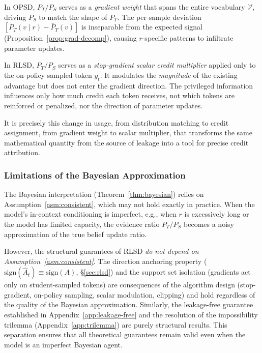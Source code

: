 \documentclass[]{jingdong}
\begin{document}
In OPSD, $P_T/P_S$ serves as a \textit{gradient weight} that spans the entire vocabulary $\mathcal{V}$, driving $P_S$ to match the shape of $P_T$. The per-sample deviation $[P_T(v \mid r) - \bar{P}_T(v)]$ is inseparable from the expected signal (Proposition~\ref{prop:grad-decomp}), causing $r$-specific patterns to infiltrate parameter updates.

In RLSD, $P_T/P_S$ serves as a \textit{stop-gradient scalar credit multiplier} applied only to the on-policy sampled token $y_t$. It modulates the \textit{magnitude} of the existing advantage but does not enter the gradient direction. The privileged information influences only how much credit each token receives, not which tokens are reinforced or penalized, nor the direction of parameter updates.

It is precisely this change in usage, from distribution matching to credit assignment, from gradient weight to scalar multiplier, that transforms the same mathematical quantity from the source of leakage into a tool for precise credit attribution.


\subsubsection{Limitations of the Bayesian Approximation}
\label{app:bayesian-limitations}

The Bayesian interpretation (Theorem~\ref{thm:bayesian}) relies on Assumption~\ref{asm:consistent}, which may not hold exactly in practice. When the model's in-context conditioning is imperfect, e.g., when $r$ is excessively long or the model has limited capacity, the evidence ratio $P_T/P_S$ becomes a noisy approximation of the true belief update ratio.

However, the structural guarantees of RLSD \textit{do not depend on Assumption~\ref{asm:consistent}}. The direction anchoring property ($\mathrm{sign}(\hat{A}_t) \equiv \mathrm{sign}(A)$, \S\ref{sec:rlsd}) and the support set isolation (gradients act only on student-sampled tokens) are consequences of the algorithm design (stop-gradient, on-policy sampling, scalar modulation, clipping) and hold regardless of the quality of the Bayesian approximation. Similarly, the leakage-free guarantee established in Appendix~\ref{app:leakage-free} and the resolution of the impossibility trilemma (Appendix~\ref{app:trilemma}) are purely structural results. This separation ensures that all theoretical guarantees remain valid even when the model is an imperfect Bayesian agent.
\end{document}
